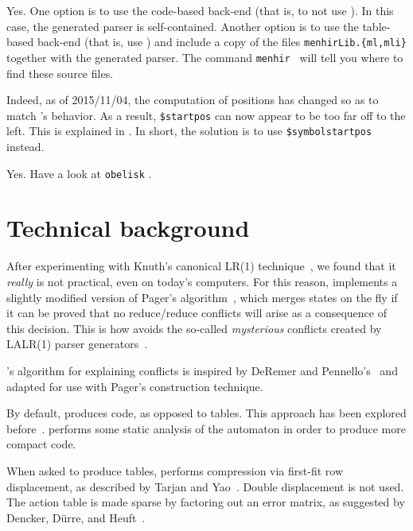 \documentclass[onecolumn,11pt,nocopyrightspace,preprint]{sigplanconf}
\begin{document}
Yes. One option is to use the code-based back-end (that is, to not
use \otable). In this case, the generated parser is self-contained. Another
option is to use the table-based back-end (that is, use \otable) and include a
copy of the files \verb+menhirLib.{ml,mli}+ together with the generated
parser. The command \texttt{menhir \osuggestmenhirlib} will tell you where to
find these source files.

Indeed, as of 2015/11/04, the computation of positions has changed so as to match \ocamlyacc's
behavior. As a result, \texttt{\$startpos} can now appear to be too far off to the left. This is explained
in . In short, the solution is to use \verb+$symbolstartpos+ instead.

Yes. Have a look at \texttt{obelisk} \cite{obelisk}.


\section{Technical background}

After experimenting with Knuth's canonical LR(1) technique~\cite{knuth-lr-65},
we found that it \emph{really} is not practical, even on today's computers.
For this reason, \menhir implements a slightly modified version of Pager's
algorithm~\cite{pager-77}, which merges states on the fly if it can be proved
that no reduce/reduce conflicts will arise as a consequence of this decision.
This is how \menhir avoids the so-called \emph{mysterious} conflicts created
by LALR(1) parser generators~\cite[section 5.7]{bison}.

\menhir's algorithm for explaining conflicts is inspired by DeRemer and
Pennello's~\cite{deremer-pennello-82} and adapted for use with Pager's
construction technique.

By default, \menhir produces code, as opposed to tables. This approach has
been explored before~\cite{bhamidipaty-proebsting-98,horspool-faster-90}.
\menhir performs some static analysis of the automaton in order to produce
more compact code.

When asked to produce tables, \menhir performs compression via first-fit
row displacement, as described by Tarjan and Yao~\cite{tarjan-yao-79}.
Double displacement is not used. The action table is made sparse by
factoring out an error matrix, as suggested by Dencker, Dürre, and
Heuft~\cite{dencker-84}.
\end{document}
